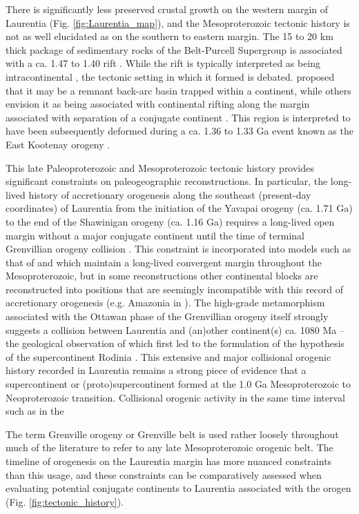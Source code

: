 \documentclass[11pt,letterpaper]{article}
\begin{document}
There is significantly less preserved crustal growth on the western margin of Laurentia (Fig. \ref{fig:Laurentia_map}), and the Mesoproterozoic tectonic history is not as well elucidated as on the southern to eastern margin. The 15 to 20 km thick package of sedimentary rocks of the Belt-Purcell Supergroup is associated with a ca. 1.47 to 1.40 rift \citep{Evans2000c}. While the rift is typically interpreted as being intracontinental \citep{Lydon2004a}, the tectonic setting in which it formed is debated. \citet{Hoffman1989a} proposed that it may be a remnant back-arc basin trapped within a continent, while others envision it as being associated with continental rifting along the margin associated with separation of a conjugate continent \citep{Jones2015a}. This region is interpreted to have been subsequently deformed during a ca. 1.36 to 1.33 Ga event known as the East Kootenay orogeny \citep{McMechan1982a, Nesheim2012a, McFarlane2015a}. 

This late Paleoproterozoic and Mesoproterozoic tectonic history provides significant constraints on paleogeographic reconstructions. In particular, the long-lived history of accretionary orogenesis along the southeast (present-day coordinates) of Laurentia from the initiation of the Yavapai orogeny (ca. 1.71 Ga) to the end of the Shawinigan orogeny (ca. 1.16 Ga) requires a long-lived open margin without a major conjugate continent until the time of terminal Grenvillian orogeny collision \citep{Karlstrom2001a}. This constraint is incorporated into models such as that of \citet{Zhang2012a} and \citet{Pehrsson2015a} which maintain a long-lived convergent margin throughout the Mesoproterozoic, but in some reconstructions other continental blocks are reconstructed into positions that are seemingly incompatible with this record of accretionary orogenesis (e.g. Amazonia in \citealp{Elming2009a}). The high-grade metamorphism associated with the Ottawan phase of the Grenvillian orogeny itself strongly suggests a collision between Laurentia and (an)other continent(s) ca. 1080 Ma -- the geological observation of which first led to the formulation of the hypothesis of the supercontinent Rodinia \citep{Hoffman1991a}. This extensive and major collisional orogenic history recorded in Laurentia remains a strong piece of evidence that a supercontinent or (proto)supercontinent formed at the 1.0 Ga Mesoproterozoic to Neoproterozoic transition. Collisional orogenic activity in the same time interval such as in the 

The term Grenville orogeny or Grenville belt is used rather loosely throughout much of the literature to refer to any late Mesoproterozoic orogenic belt. The timeline of orogenesis on the Laurentia margin has more nuanced constraints than this usage, and these constraints can be comparatively assessed when evaluating potential conjugate continents to Laurentia associated with the orogen (Fig. \ref{fig:tectonic_history}).
\end{document}
